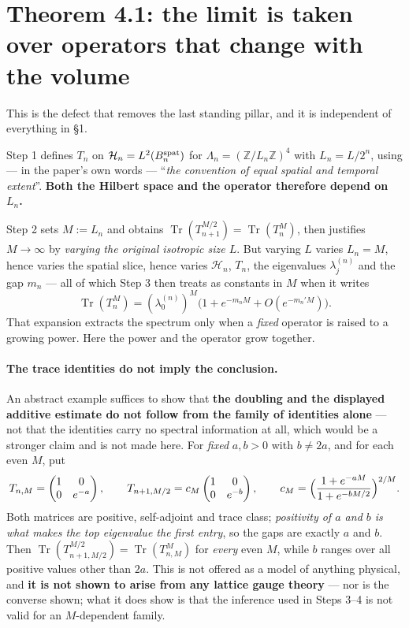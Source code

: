 \documentclass[11pt]{article}
\newcommand{\Hil}{\mathcal H}
\begin{document}
\section{Theorem 4.1: the limit is taken over operators that change with the volume}

This is the defect that removes the last standing pillar, and it is independent of
everything in \S1.

Step 1 defines $T_n$ on $\Hil_n=L^2(B_n^{\rm spat})$ for
$\Lambda_n=(\mathbb Z/L_n\mathbb Z)^4$ with $L_n=L/2^n$, using --- in the paper's own
words --- ``\emph{the convention of equal spatial and temporal extent}''. \textbf{Both
the Hilbert space and the operator therefore depend on $L_n$.}

Step 2 sets $M:=L_n$ and obtains
$\operatorname{Tr}(T_{n+1}^{M/2})=\operatorname{Tr}(T_n^{M})$, then justifies
$M\to\infty$ by \emph{varying the original isotropic size $L$}. But varying $L$ varies
$L_n=M$, hence varies the spatial slice, hence varies $\Hil_{n}$, $T_{n}$, the
eigenvalues $\lambda_j^{(n)}$ and the gap $m_n$ --- all of which Step 3 then treats as
constants in $M$ when it writes
\[
\operatorname{Tr}(T_n^M)=(\lambda_0^{(n)})^M\bigl(1+e^{-m_nM}+O(e^{-m_n'M})\bigr).
\]
That expansion extracts the spectrum only when a \emph{fixed} operator is raised to a
growing power. Here the power and the operator grow together.

\paragraph{The trace identities do not imply the conclusion.} An abstract example
suffices to show that \textbf{the doubling and the displayed additive estimate do not
follow from the family of identities alone} --- not that the identities carry no
spectral information at all, which would be a stronger claim and is not made here. For \emph{fixed} $a,b>0$ with $b\neq 2a$, and for each even $M$, put
\[
T_{n,M}=\begin{pmatrix}1&0\\0&e^{-a}\end{pmatrix},\qquad
T_{n+1,M/2}=c_M\begin{pmatrix}1&0\\0&e^{-b}\end{pmatrix},\qquad
c_M=\Bigl(\frac{1+e^{-aM}}{1+e^{-bM/2}}\Bigr)^{2/M}.
\]
Both matrices are positive, self-adjoint and trace class; \emph{positivity of $a$ and
$b$ is what makes the top eigenvalue the first entry}, so the gaps are exactly $a$ and
$b$. Then $\operatorname{Tr}(T_{n+1,M/2}^{M/2})=\operatorname{Tr}(T_{n,M}^{M})$ for
\emph{every} even $M$, while $b$ ranges over all positive values other than $2a$. This
is not offered as a model of anything physical, and \textbf{it is not shown to arise
from any lattice gauge theory} --- nor is the converse shown; what it does show is that
the inference used in Steps 3--4 is not valid for an $M$-dependent family.
\end{document}
